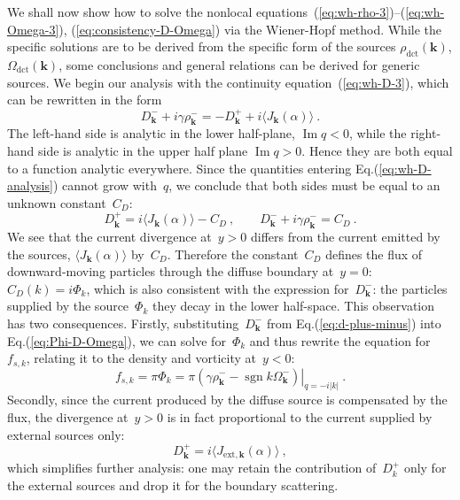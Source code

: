 \documentclass[preprint,aps,eqsecnum, prb]{revtex4-1}
\newcommand{\fplus}[1]{{#1}^{+}}
\newcommand{\fminus}[1]{{#1}^{-}}
\renewcommand{\Im}{\mathop{\mathrm{Im}}\nolimits}
\newcommand{\sgn}{\mathop{\mathrm{sgn}}\nolimits}
\newcommand{\dct}[1]{{#1}_\mathrm{dct}}
\begin{document}
We shall now show how to solve the nonlocal
equations~(\ref{eq:wh-rho-3})--(\ref{eq:wh-Omega-3}),
(\ref{eq:consistency-D-Omega})
via the Wiener-Hopf method. While the specific solutions
are to be derived from the specific form of the sources
$\dct{\rho}({\bm k})$, $\dct{\Omega}({\bm k})$,  some conclusions
and general relations can be derived for generic sources.
We begin our analysis with the continuity
equation~(\ref{eq:wh-D-3}), which can be rewritten  in the form
\begin{equation}
  \label{eq:wh-D-analysis}
  \fminus{D}_{\bm k} + i \gamma \fminus{\rho}_{\bm k}
      = - \fplus{D}_{\bm k} + i \langle J_{\bm k}(\alpha) \rangle \ .
\end{equation}
The left-hand side is analytic in the lower half-plane, $\Im q < 0$,
while the right-hand side is analytic in the upper half plane $\Im q > 0$.
Hence they are both equal to a function analytic everywhere.
Since the quantities entering Eq.(\ref{eq:wh-D-analysis}) cannot grow with~$q$,
we conclude that both sides must be equal to an unknown constant~$C_D$:
\begin{equation}
  \label{eq:d-plus-minus}
\fplus{D}_{\bm k} = i  \langle J_{\bm k}(\alpha) \rangle - C_D\ ,
\qquad
\fminus{D}_{\bm k} + i \gamma \fminus{\rho}_{\bm k} = C_D  \ .
\end{equation}
We see that the current divergence at~$y > 0$ differs from the current emitted by
the sources, $\langle J_{\bm k}(\alpha) \rangle$ by~$C_D$.
Therefore the constant~$C_D$ defines
the flux of downward-moving particles through the diffuse boundary
at~$y = 0$: $C_D(k) = i\Phi_{k}$, which is also consistent
with the expression for~$\fminus{D}_{\bm k}$: the particles
supplied by the source~$\Phi_{k}$ they decay in the lower
half-space.
This observation has two consequences.
Firstly, substituting~$\fminus{D}_{\bm k}$ from Eq.(\ref{eq:d-plus-minus})
into Eq.(\ref{eq:Phi-D-Omega}), we can solve for~$\Phi_{k}$ and thus
rewrite the equation for~$f_{s, k}$,
relating it to the density and vorticity at~$y < 0$:
\begin{equation}
  \label{eq:flux-rho-Omega}
  f_{s, k} = \pi \Phi_{k} = \pi \left. \left(\gamma \fminus{\rho}_{\bm k}
                        - \sgn k \fminus{\Omega}_{\bm k}
                        \right)\right|_{q = -i |k|}
  \ .
\end{equation}
Secondly, since the current produced by the diffuse source is compensated
by the flux, the divergence at~$y > 0$ is in fact proportional to the current
supplied by external sources only:
\begin{equation}
  \label{eq:solution-D}
 \fplus{D}_{\bm k} = i \langle J_{\mathrm{ext}, {\bm k}}(\alpha) \rangle
 \ ,
\end{equation}
which simplifies further analysis: one may retain the
contribution of~$\fplus{D}_{k}$ only for the external sources and
drop it for the boundary scattering.
\end{document}
